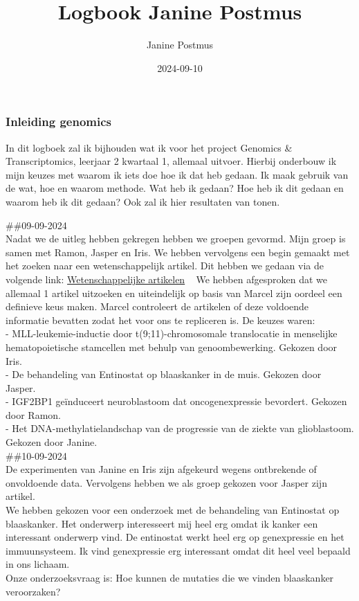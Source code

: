 \documentclass[
]{article}
\title{Logbook Janine Postmus}
\author{Janine Postmus}
\date{2024-09-10}
\begin{document}
\maketitle

\subsubsection{Inleiding genomics}\label{inleiding-genomics}

In dit logboek zal ik bijhouden wat ik voor het project Genomics \&
Transcriptomics, leerjaar 2 kwartaal 1, allemaal uitvoer. Hierbij
onderbouw ik mijn keuzes met waarom ik iets doe hoe ik dat heb gedaan.
Ik maak gebruik van de wat, hoe en waarom methode. Wat heb ik gedaan?
Hoe heb ik dit gedaan en waarom heb ik dit gedaan? Ook zal ik hier
resultaten van tonen.

\#\#09-09-2024\\
Nadat we de uitleg hebben gekregen hebben we groepen gevormd. Mijn groep
is samen met Ramon, Jasper en Iris. We hebben vervolgens een begin
gemaakt met het zoeken naar een wetenschappelijk artikel. Dit hebben we
gedaan via de volgende link:
\href{https://www.ncbi.nlm.nih.gov/gds/?term=(\%22expression+profiling+by+high+throughput+sequencing\%22\%5BDataSet+Type\%5D)+AND+\%22genome+variation+profiling+by+high+throughput+sequencing\%22\%5BDataSet+Type\%5D}{Wetenschappelijke
artikelen} ~ We hebben afgesproken dat we allemaal 1 artikel uitzoeken
en uiteindelijk op basis van Marcel zijn oordeel een definieve keus
maken. Marcel controleert de artikelen of deze voldoende informatie
bevatten zodat het voor ons te repliceren is. De keuzes waren:\\
- MLL-leukemie-inductie door t(9;11)-chromosomale translocatie in
menselijke hematopoietische stamcellen met behulp van genoombewerking.
Gekozen door Iris.\\
- De behandeling van Entinostat op blaaskanker in de muis. Gekozen door
Jasper.\\
- IGF2BP1 geïnduceert neuroblastoom dat oncogenexpressie bevordert.
Gekozen door Ramon.\\
- Het DNA-methylatielandschap van de progressie van de ziekte van
glioblastoom. Gekozen door Janine.\\

\#\#10-09-2024\\
De experimenten van Janine en Iris zijn afgekeurd wegens ontbrekende of
onvoldoende data. Vervolgens hebben we als groep gekozen voor Jasper
zijn artikel.\\
We hebben gekozen voor een onderzoek met de behandeling van Entinostat
op blaaskanker. Het onderwerp interesseert mij heel erg omdat ik kanker
een interessant onderwerp vind. De entinostat werkt heel erg op
genexpressie en het immuunsysteem. Ik vind genexpressie erg interessant
omdat dit heel veel bepaald in ons lichaam.\\
Onze onderzoeksvraag is: Hoe kunnen de mutaties die we vinden
blaaskanker veroorzaken?\\
\end{document}
